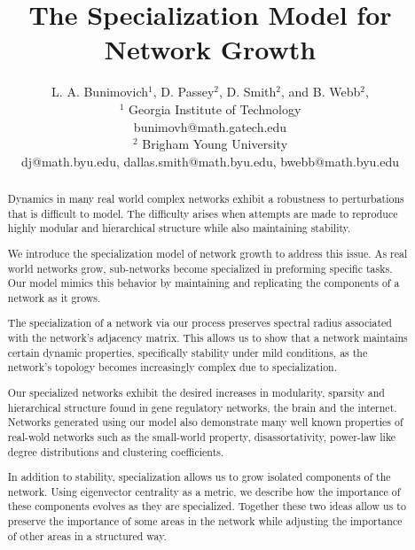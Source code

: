 \documentclass[12pt]{article}
\begin{document}
\title{\normalsize\bf%
The Specialization Model for Network Growth}

\author{L. A. Bunimovich$^1$, D. Passey$^2$, D. Smith$^2$, and B. Webb$^2$,\\
$^1$ Georgia Institute of Technology\\
bunimovh@math.gatech.edu\\
$^2$ Brigham Young University\\
dj@math.byu.edu, dallas.smith@math.byu.edu, bwebb@math.byu.edu\\}

\date{\vspace{-5ex}} %

\maketitle

\thispagestyle{empty}
\pagestyle{empty}


\begin{abstract}\normalsize
Dynamics in many real world complex networks exhibit a robustness to perturbations that is difficult to model. The difficulty arises when attempts are made to reproduce highly modular and hierarchical structure while also maintaining stability.

We introduce the specialization model of network growth to address this issue. As real world networks grow, sub-networks become specialized in preforming specific tasks. Our model mimics this behavior by maintaining and replicating the components of a network as it grows.

The specialization of a network via our process preserves spectral radius associated with the network's adjacency matrix. This allows us to show that a network maintains certain dynamic properties, specifically stability under mild conditions, as the network's topology becomes increasingly complex due to specialization.

Our specialized networks exhibit the desired increases in modularity, sparsity and hierarchical structure found in gene regulatory networks, the brain and the internet. Networks generated using our model also demonstrate many well known properties of real-wold networks such as the small-world property, disassortativity, power-law like degree distributions and clustering coefficients.

In addition to stability, specialization allows us to grow isolated components of the network. Using eigenvector centrality as a metric, we describe how the importance of these components evolves as they are specialized. Together these two ideas allow us to preserve the importance of some areas in the network while adjusting the importance of other areas in a structured way.


\end{abstract}
\end{document}

